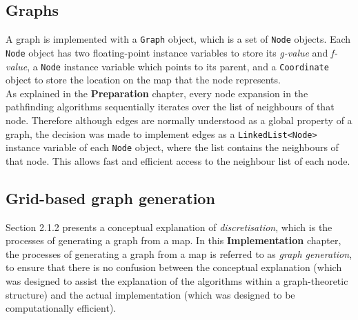 \documentclass[12pt,notitlepage]{report}
\begin{document}
\subsection{Graphs}
A graph is implemented with a {\tt Graph} object, which is a set of {\tt Node} objects. Each {\tt Node} object has two floating-point instance variables to store its {\em g-value} and {\em f-value}, a {\tt Node} instance variable which points to its parent, and a {\tt Coordinate} object to store the location on the map that the node represents.\\

\noindent
As explained in the {\bfseries Preparation} chapter, every node expansion in the pathfinding algorithms sequentially iterates over the list of neighbours of that node. Therefore although edges are normally understood as a global property of a graph, the decision was made to implement edges as a {\tt LinkedList<Node>} instance variable of each {\tt Node} object, where the list contains the neighbours of that node. This allows fast and efficient access to the neighbour list of each node.\\

\subsection{Grid-based graph generation}
Section 2.1.2 presents a conceptual explanation of {\em discretisation}, which is the processes of generating a graph from a map. In this {\bfseries Implementation} chapter, the processes of generating a graph from a map is referred to as {\em graph generation}, to ensure that there is no confusion between the conceptual explanation (which was designed to assist the explanation of the algorithms within a graph-theoretic structure) and the actual implementation (which was designed to be computationally efficient). \\
\end{document}
